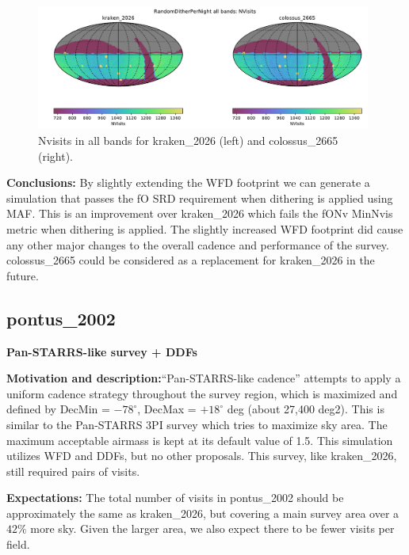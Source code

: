\documentclass[DM,authoryear,toc]{lsstdoc}
\begin{document}
\begin{figure}[ht]
\centering
\includegraphics[width=0.98\textwidth]{figures/colossus_2665_kraken_2026_NVisits_RandomDitherPerNight_all_bands_HEAL_ComboSkyMap.pdf}
\caption{Nvisits in all bands for kraken\_2026 (left) and colossus\_2665 (right).}
\label{fig:dither_nvisits-2665}
\end{figure}

\textbf{Conclusions:} By slightly extending the WFD footprint we can generate a simulation that passes the fO SRD
requirement when dithering is applied using MAF. This is an improvement over kraken\_2026 which fails the fONv MinNvis metric
when dithering is applied. The slightly increased WFD footprint did cause any other major changes to the overall cadence and
performance of the survey. colossus\_2665 could be considered as a replacement for kraken\_2026 in the future.

\subsection{pontus\_2002} \label{pontus2002}

\textbf{Pan-STARRS-like survey + DDFs}

\textbf{Motivation and description:}``Pan-STARRS-like cadence'' attempts to apply a uniform cadence strategy
throughout the survey region, which is maximized and defined by DecMin = $-78^{\circ}$, DecMax = $+18^{\circ}$ deg (about 27,400 deg2).
This is similar to the Pan-STARRS 3PI survey which tries to maximize sky area. The maximum acceptable airmass
is kept at its default value of 1.5. This simulation utilizes WFD and DDFs, but no other proposals.
This survey, like kraken\_2026, still required pairs of visits.

\textbf{Expectations:} The total number of visits in pontus\_2002 should be approximately the same as kraken\_2026,
but covering a main survey area over a $42\%$ more sky. Given the larger area, we also expect there to be
fewer visits per field.
\end{document}
